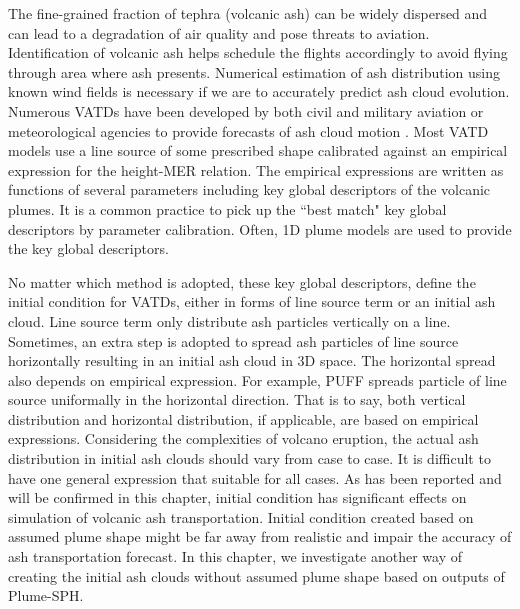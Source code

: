 The fine-grained fraction of tephra (volcanic ash) can be widely dispersed and can lead to a degradation of air quality and pose threats to aviation. Identification of volcanic ash helps schedule the flights accordingly to avoid flying through area where ash presents. Numerical estimation of ash distribution using known wind fields is necessary if we are to accurately predict ash cloud evolution. Numerous VATDs have been developed by both civil and military aviation or meteorological agencies to provide forecasts of ash cloud motion \citep{witham2007comparison}. Most VATD models use a line source of some prescribed shape calibrated against an empirical expression for the height-MER relation. The empirical expressions are written as functions of several parameters including key global descriptors of the volcanic plumes. It is a common practice to pick up the ``best match" key global descriptors by parameter calibration. Often, 1D plume models are used to provide the key global descriptors.

No matter which method is adopted, these key global descriptors, define the initial condition for VATDs, either in forms of line source term or an initial ash cloud. Line source term only distribute ash particles vertically on a line. Sometimes, an extra step is adopted to spread ash particles of line source horizontally resulting in an initial ash cloud in 3D space.
The horizontal spread also depends on empirical expression. For example, PUFF spreads particle of line source uniformally in the horizontal direction.
That is to say, both vertical distribution and horizontal distribution, if applicable, are based on empirical expressions.
Considering the complexities of volcano eruption, the actual ash distribution in initial ash clouds should vary from case to case. It is difficult to have one general expression that suitable for all cases. As has been reported and will be confirmed in this chapter, initial condition has significant effects on simulation of volcanic ash transportation. Initial condition created based on assumed plume shape might be far away from realistic and impair the accuracy of ash transportation forecast. In this chapter, we investigate another way of creating the initial ash clouds without assumed plume shape based on outputs of Plume-SPH.

